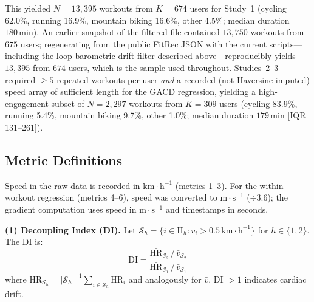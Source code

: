 \documentclass[times, twoside]{zHenriquesLab-StyleBioRxiv}
\begin{document}
This yielded $N = 13{,}395$ workouts from $K = 674$ users for Study~1 (cycling 62.0\%, running 16.9\%, mountain biking 16.6\%, other 4.5\%; median duration $180\,\mathrm{min}$). An earlier snapshot of the filtered file contained $13{,}750$ workouts from $675$ users; regenerating from the public FitRec JSON with the current scripts---including the loop barometric-drift filter described above---reproducibly yields $13{,}395$ from $674$ users, which is the sample used throughout. Studies~2--3 required $\geq 5$ repeated workouts per user \textit{and} a recorded (not Haversine-imputed) speed array of sufficient length for the GACD regression, yielding a high-engagement subset of $N = 2{,}297$ workouts from $K = 309$ users (cycling 83.9\%, running 5.4\%, mountain biking 9.7\%, other 1.0\%; median duration $179\,\mathrm{min}$ [IQR 131--261]).

\subsection*{Metric Definitions}

Speed in the raw data is recorded in $\mathrm{km{\cdot}h^{-1}}$ (metrics 1--3). For the within-workout regression (metrics 4--6), speed was converted to $\mathrm{m{\cdot}s^{-1}}$ ($\div 3.6$); the gradient computation uses speed in $\mathrm{m{\cdot}s^{-1}}$ and timestamps in seconds.

\textbf{(1) Decoupling Index (DI).} Let $\mathcal{S}_h = \{i \in \text{H}_h : v_i > 0.5\,\mathrm{km{\cdot}h^{-1}}\}$ for $h \in \{1, 2\}$. The DI is:
\[
  \text{DI} = \frac{\bar{\text{HR}}_{\mathcal{S}_2} \,/\, \bar{v}_{\mathcal{S}_2}}{\bar{\text{HR}}_{\mathcal{S}_1} \,/\, \bar{v}_{\mathcal{S}_1}}
\]
where $\bar{\text{HR}}_{\mathcal{S}_h} = |\mathcal{S}_h|^{-1}\sum_{i \in \mathcal{S}_h} \text{HR}_i$ and analogously for $\bar{v}$. DI $> 1$ indicates cardiac drift.
\end{document}
